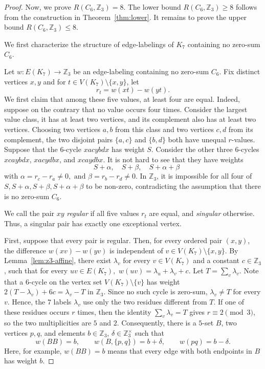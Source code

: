 \documentclass[11pt]{article}
\theoremstyle{remark}
\newcommand{\Z}{\mathbb Z}
\begin{document}
\begin{proof}
    Now, we prove $R(C_6,\Z_3)=8$.
    The lower bound $R(C_6,\Z_3)\ge 8$ follows from the construction in Theorem~\ref{thm:lower}.
    It remains to prove the upper bound $R(C_6,\Z_3)\le 8$.

    We first characterize the structure of edge-labelings of $K_7$ containing no zero-sum $C_6$.

    Let $w\colon E(K_7)\to\Z_3$ be an edge-labeling containing no zero-sum $C_6$.
    Fix distinct vertices $x,y$ and for $t\in V(K_7)\setminus\{x,y\}$, let
    \[
        r_t=w(xt)-w(yt).
    \]
    We first claim that among these five values, at least four are equal.
    Indeed, suppose on the contrary that no value occurs four times.
    Consider the largest value class,
    it has at least two vertices, and its complement also has at least two vertices.  Choosing two vertices $a,b$ from this class and two vertices $c,d$ from its complement, the two disjoint pairs $\{a,c\}$ and $\{b,d\}$ both have unequal $r$-values.
    Suppose that the $6$-cycle $xacybdx$ has weight $S$.
    Consider the other three $6$-cycles $xcaybdx$, $xacydbx$, and $xcaydbx$.
    It is not hard to see that they have weights
    \[
        \quad S+\alpha,
        \quad S+\beta,
        \quad S+\alpha+\beta
    \]
    with $\alpha=r_c-r_a\ne 0, \text{ and } \beta=r_b-r_d\ne0$.
    In $\Z_3$, it is impossible for all four of $S,S+\alpha, S+\beta, S+\alpha+\beta$ to be non-zero, contradicting the assumption that there is no zero-sum $C_6$.

    We call the pair $xy$ \emph{regular} if all five values $r_t$ are equal, and \emph{singular} otherwise.
    Thus, a singular pair has exactly one exceptional vertex.

    First, suppose that every pair is regular.
    Then, for every ordered pair $(x,y)$, the difference $w(xv)-w(yv)$
    is independent of $v\in V(K_7)\setminus\{x,y\}.$
    By Lemma~\ref{lem:z3-affine}, there exist $\lambda_v$ for every $v\in V(K_7)$ and a constant $c\in\Z_3$, such that for every $uv\in E(K_7),$ $w(uv)=\lambda_u+\lambda_v+c.$
    Let $T=\sum_v\lambda_v$.
    Note that a $6$-cycle on the vertex set $V(K_7)\setminus\{v\}$ has weight $2(T-\lambda_v)+6c=\lambda_v-T$ in $\Z_3$.
    Since no such cycle is zero-sum, $\lambda_v\ne T$ for every $v$.
    Hence, the $7$ labels $\lambda_v$ use only the two residues different from $T$.
    If one of these residues occurs $r$ times, then the identity $\sum_v\lambda_v=T$ gives $r\equiv2\pmod3$, so the two multiplicities are $5$ and $2$.  Consequently, there is a $5$-set $B$, two vertices $p,q$, and elements $b\in\Z_3$, $\delta\in\Z_3^\times$ such that
    \begin{equation}\label{Equ:regular structure for K7}
        w(BB)=b,
        \qquad
        w(B,\{p,q\})=b+\delta,
        \qquad
        w(pq)=b-\delta.
    \end{equation}
    Here, for example, $w(BB)=b$ means that every edge with both endpoints in $B$ has weight $b$.
    \medskip


\end{proof}
\end{document}
